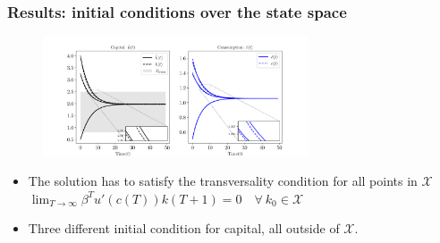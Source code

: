 \documentclass[aspectratio=169,10pt]{beamer}
\newcommand{\Xdom}{\mathcal{X}}
\begin{document}
\begin{frame}[label = rec-all-over-space]
	\frametitle{Results: initial conditions over the state space}
	\begin{figure}[t!]
		\hspace*{-15mm}
		\centering
		\includegraphics[width=0.7\textwidth]{figs/growth_recursive_g0_var_initial_k_0_one_run}
	\end{figure}
		\begin{itemize}
			\item The solution has to satisfy the transversality condition for all points in $\Xdom$ 			\smallskip
			 $\lim_{T\to\infty}\beta^T u'(c(T))k(T+1) =0 \quad \forall ~ k_0 \in \Xdom$
			 \item Three different initial condition for capital, all outside of $\Xdom$.
		\end{itemize}
		\hyperlink{res-rec}{}
\end{frame}
\end{document}
